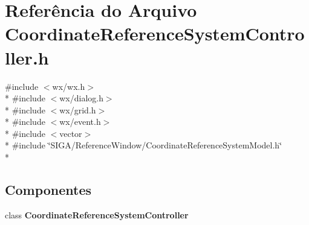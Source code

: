 \section{Referência do Arquivo Coordinate\+Reference\+System\+Controller.\+h}
\label{_coordinate_reference_system_controller_8h}
{\ttfamily \#include $<$wx/wx.\+h$>$}\\*
{\ttfamily \#include $<$wx/dialog.\+h$>$}\\*
{\ttfamily \#include $<$wx/grid.\+h$>$}\\*
{\ttfamily \#include $<$wx/event.\+h$>$}\\*
{\ttfamily \#include $<$vector$>$}\\*
{\ttfamily \#include \char`\"{}S\+I\+G\+A/\+Reference\+Window/\+Coordinate\+Reference\+System\+Model.\+h\char`\"{}}\\*
\subsection*{Componentes}
\begin{DoxyCompactItemize}
\item 
class {\bf Coordinate\+Reference\+System\+Controller}
\end{DoxyCompactItemize}
